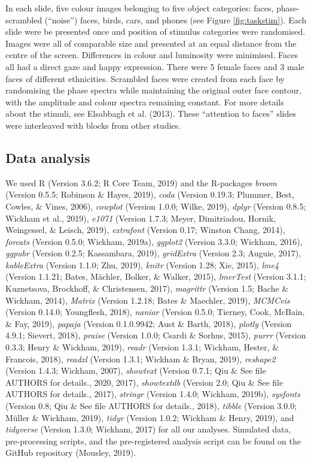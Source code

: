 \documentclass[english,man,floatsintext]{apa6}
\begin{document}
In each slide, five colour images belonging to five object categories: faces, phase-scrambled (\enquote{noise}) faces, birds, cars, and phones (see Figure \ref{fig:taskstim}). Each slide were be presented once and position of stimulus categories were randomised. Images were all of comparable size and presented at an equal distance from the centre of the screen. Differences in colour and luminosity were minimised. Faces all had a direct gaze and happy expression. There were 5 female faces and 3 male faces of different ethnicities. Scrambled faces were created from each face by randomising the phase spectra while maintaining the original outer face contour, with the amplitude and colour spectra remaining constant. For more details about the stimuli, see Elsabbagh et al. (2013). These \enquote{attention to faces} slides were interleaved with blocks from other studies.

\hypertarget{data-analysis}{%
\subsection{Data analysis}\label{data-analysis}}

We used R (Version 3.6.2; R Core Team, 2019) and the R-packages \emph{broom} (Version 0.5.5; Robinson \& Hayes, 2019), \emph{coda} (Version 0.19.3; Plummer, Best, Cowles, \& Vines, 2006), \emph{cowplot} (Version 1.0.0; Wilke, 2019), \emph{dplyr} (Version 0.8.5; Wickham et al., 2019), \emph{e1071} (Version 1.7.3; Meyer, Dimitriadou, Hornik, Weingessel, \& Leisch, 2019), \emph{extrafont} (Version 0.17; Winston Chang, 2014), \emph{forcats} (Version 0.5.0; Wickham, 2019a), \emph{ggplot2} (Version 3.3.0; Wickham, 2016), \emph{ggpubr} (Version 0.2.5; Kassambara, 2019), \emph{gridExtra} (Version 2.3; Auguie, 2017), \emph{kableExtra} (Version 1.1.0; Zhu, 2019), \emph{knitr} (Version 1.28; Xie, 2015), \emph{lme4} (Version 1.1.21; Bates, Mächler, Bolker, \& Walker, 2015), \emph{lmerTest} (Version 3.1.1; Kuznetsova, Brockhoff, \& Christensen, 2017), \emph{magrittr} (Version 1.5; Bache \& Wickham, 2014), \emph{Matrix} (Version 1.2.18; Bates \& Maechler, 2019), \emph{MCMCvis} (Version 0.14.0; Youngflesh, 2018), \emph{naniar} (Version 0.5.0; Tierney, Cook, McBain, \& Fay, 2019), \emph{papaja} (Version 0.1.0.9942; Aust \& Barth, 2018), \emph{plotly} (Version 4.9.1; Sievert, 2018), \emph{praise} (Version 1.0.0; Csardi \& Sorhus, 2015), \emph{purrr} (Version 0.3.3; Henry \& Wickham, 2019), \emph{readr} (Version 1.3.1; Wickham, Hester, \& Francois, 2018), \emph{readxl} (Version 1.3.1; Wickham \& Bryan, 2019), \emph{reshape2} (Version 1.4.3; Wickham, 2007), \emph{showtext} (Version 0.7.1; Qiu \& See file AUTHORS for details., 2020, 2017), \emph{showtextdb} (Version 2.0; Qiu \& See file AUTHORS for details., 2017), \emph{stringr} (Version 1.4.0; Wickham, 2019b), \emph{sysfonts} (Version 0.8; Qiu \& See file AUTHORS for details., 2018), \emph{tibble} (Version 3.0.0; Müller \& Wickham, 2019), \emph{tidyr} (Version 1.0.2; Wickham \& Henry, 2019), and \emph{tidyverse} (Version 1.3.0; Wickham, 2017) for all our analyses. Simulated data, pre-processing scripts, and the pre-registered analysis script can be found on the GitHub repository (Mousley, 2019).
\end{document}
